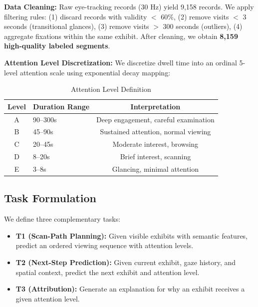 \documentclass{letterpaper,article}
\begin{document}
\textbf{Data Cleaning:} Raw eye-tracking records (30 Hz) yield 9,158 records. We apply filtering rules: (1) discard records with validity $<$ 60\%, (2) remove visits $<$ 3 seconds (transitional glances), (3) remove visits $>$ 300 seconds (outliers), (4) aggregate fixations within the same exhibit. After cleaning, we obtain \textbf{8,159 high-quality labeled segments}.

\textbf{Attention Level Discretization:} We discretize dwell time into an ordinal 5-level attention scale using exponential decay mapping:

\begin{table}[h]
\centering
\caption{Attention Level Definition}
\begin{tabular}{clc}
\toprule
Level & Duration Range & Interpretation \\
\midrule
A & 90--300s & Deep engagement, careful examination \\
B & 45--90s & Sustained attention, normal viewing \\
C & 20--45s & Moderate interest, browsing \\
D & 8--20s & Brief interest, scanning \\
E & 3--8s & Glancing, minimal attention \\
\bottomrule
\end{tabular}
\end{table}

\subsection{Task Formulation}

We define three complementary tasks:

\begin{itemize}
    \item \textbf{T1 (Scan-Path Planning):} Given visible exhibits with semantic features, predict an ordered viewing sequence with attention levels.
    \item \textbf{T2 (Next-Step Prediction):} Given current exhibit, gaze history, and spatial context, predict the next exhibit and attention level.
    \item \textbf{T3 (Attribution):} Generate an explanation for why an exhibit receives a given attention level.
\end{itemize}
\end{document}
